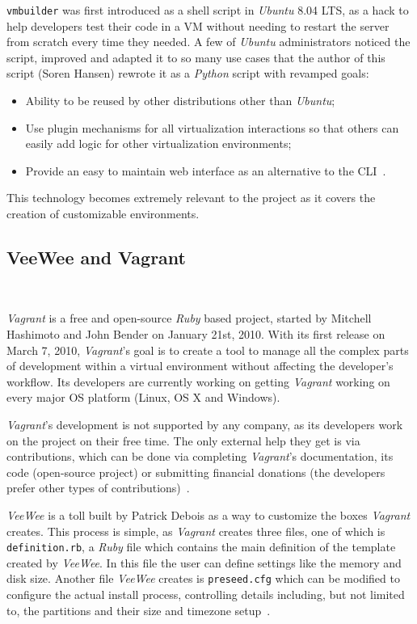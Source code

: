 \texttt{vmbuilder} was first introduced as a shell script in \textit{Ubuntu} 8.04 LTS, as a hack to help developers test their code in a VM without needing to restart the server from scratch every time they needed. A few of \textit{Ubuntu} administrators noticed the script, improved and adapted it to so many use cases that the author of this script (Soren Hansen) rewrote it as a \textit{Python} script with revamped goals:

\begin{itemize}
\item Ability to be reused by other distributions other than \textit{Ubuntu};
\item Use plugin mechanisms for all virtualization interactions so that others can easily add logic for other virtualization environments;
\item Provide an easy to maintain web interface as an alternative to the CLI~\cite{jeos}.
\end{itemize}

This technology becomes extremely relevant to the project as it covers the creation of customizable environments.
\subsection{VeeWee and Vagrant}~\label{subsec:veewee}

\textit{Vagrant} is a free and open-source \textit{Ruby} based project, started by Mitchell Hashimoto and John Bender on January 21st, 2010. With its first release on March 7, 2010, \textit{Vagrant}'s goal is to create a tool to manage all the complex parts of development within a virtual environment without affecting the developer's workflow. Its developers are currently working on getting \textit{Vagrant} working on every major OS platform (Linux, OS X and Windows).

\textit{Vagrant}'s development is not supported by any company, as its developers work on the project on their free time. The only external help they get is via contributions, which can be done via completing \textit{Vagrant}'s documentation, its code (open-source project) or submitting financial donations (the developers prefer other types of contributions)~\cite{vagrant-contribution}.

\textit{VeeWee} is a toll built by Patrick Debois as a way to customize the boxes \textit{Vagrant} creates. This process is simple, as \textit{Vagrant} creates three files, one of which is \texttt{definition.rb}, a \textit{Ruby} file which contains the main definition of the template created by \textit{VeeWee}. In this file the user can define settings like the memory and disk size. Another file \textit{VeeWee} creates is \texttt{preseed.cfg} which can be modified to configure the actual install process, controlling details including, but not limited to, the partitions and their size and timezone setup~\cite{vagrant-ducea}.

